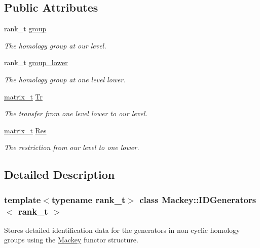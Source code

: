 \subsection*{Public Attributes}
\begin{DoxyCompactItemize}
\item 
rank\+\_\+t \hyperlink{classMackey_1_1IDGenerators_a0542bce4c4bcc9037146e04e6fe1d350}{group}
\begin{DoxyCompactList}\small\item\em The homology group at our level. \end{DoxyCompactList}\item 
rank\+\_\+t \hyperlink{classMackey_1_1IDGenerators_a6108bbb2965a14d7835b9d99167e7315}{group\+\_\+lower}
\begin{DoxyCompactList}\small\item\em The homology group at one level lower. \end{DoxyCompactList}\item 
\hyperlink{classMackey_1_1IDGenerators_a6b4c91c53aa7fe61ae93a716e891832f}{matrix\+\_\+t} \hyperlink{classMackey_1_1IDGenerators_a5aa6391d6fa79951f6d11e880c79081b}{Tr}
\begin{DoxyCompactList}\small\item\em The transfer from one level lower to our level. \end{DoxyCompactList}\item 
\hyperlink{classMackey_1_1IDGenerators_a6b4c91c53aa7fe61ae93a716e891832f}{matrix\+\_\+t} \hyperlink{classMackey_1_1IDGenerators_a8512fc6a9becb6261a703e6131225e3f}{Res}
\begin{DoxyCompactList}\small\item\em The restriction from our level to one lower. \end{DoxyCompactList}\end{DoxyCompactItemize}


\subsection{Detailed Description}
\subsubsection*{template$<$typename rank\+\_\+t$>$\newline
class Mackey\+::\+I\+D\+Generators$<$ rank\+\_\+t $>$}

Stores detailed identification data for the generators in non cyclic homology groups using the \hyperlink{namespaceMackey}{Mackey} functor structure. 

